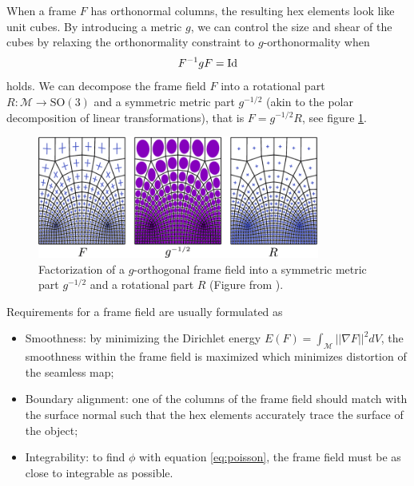 \documentclass[../thesis.tex]{subfiles}
\begin{document}
When a frame $F$ has orthonormal columns, the resulting hex elements look like unit cubes.
By introducing a metric $g$, we can control the size and shear of the cubes by
relaxing the orthonormality constraint to $g$-orthonormality when
$$F^{-1}gF = \operatorname{Id}$$
holds. We can decompose the frame field $F$ into a rotational part $R : \mathcal{M} \to \text{SO}(3)$ and a symmetric metric part $g^{-1/2}$
(akin to the polar decomposition of linear transformations)\cite{Panozzo}, that is $F = g^{-1/2}R$,
see figure \ref{fig:factorization}.
\begin{figure}[htb]
  \centering
  \includegraphics[width=25em]{figures/factorization}
  \caption{Factorization of a $g$-orthogonal frame field into a symmetric metric part $g^{-1/2}$ and a rotational part $R$
  (Figure from \cite{Fang23}).}
  \label{fig:factorization}
\end{figure}
Requirements for a frame field are usually formulated as
\begin{itemize}
  \item Smoothness: by minimizing the Dirichlet energy $E(F)=\int_{\mathcal{M}}||\nabla F||^2 dV $, the smoothness within the frame field is maximized which minimizes distortion of the seamless map;
  \item Boundary alignment: one of the columns of the frame field should match with the surface normal such that the hex elements accurately trace the surface of the object;
  \item Integrability: to find $\phi$ with equation \ref{eq:poisson}, the frame field must be as close to integrable as possible.
\end{itemize}
\end{document}
